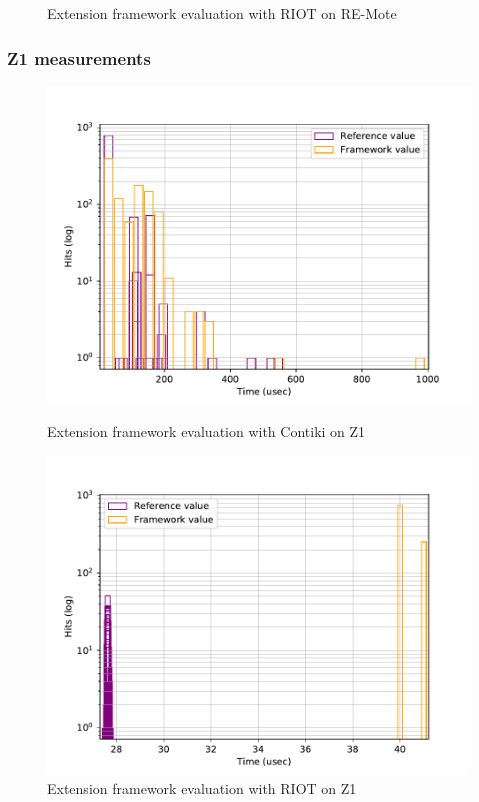 \begin{figure}[!ht]
\begin{minipage}{.45\textwidth}
      \caption{Extension framework evaluation with RIOT on RE-Mote\label{fig:comparison-extension-framework-riot-remote}}
  \end{minipage}
\end{figure}

\subsubsection{Z1 measurements}



\begin{figure}[!ht]
  \begin{minipage}{.45\textwidth}
      \centering
      \includegraphics[scale=.4]{assets/comparison-extension-framework-contiki-z1.pdf}
      \caption{Extension framework evaluation with Contiki on Z1\label{fig:comparison-extension-framework-contiki-z1}}
  \end{minipage}\hfill
  \begin{minipage}{.45\textwidth}        
      \centering
      \includegraphics[scale=.4]{assets/comparison-extension-framework-riot-z1.pdf}
      \caption{Extension framework evaluation with RIOT on Z1\label{fig:comparison-extension-framework-riot-z1}}
  \end{minipage}
\end{figure}

